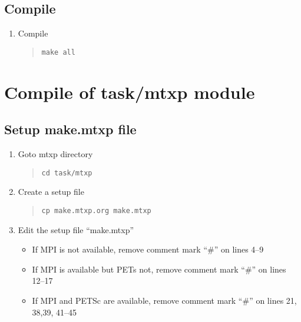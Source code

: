 \documentclass[11pt]{article}
\begin{document}
\subsection{Compile}
\begin{enumerate}
\item
Compile
\begin{quote}
\begin{verbatim}
make all
\end{verbatim}
\end{quote}
\end{enumerate}

\section{Compile of task/mtxp module}

\subsection{Setup make.mtxp file}
\begin{enumerate}
\item
Goto mtxp directory
\begin{quote}
\begin{verbatim}
cd task/mtxp
\end{verbatim}
\end{quote}
\item
Create a setup file 
\begin{quote}
\begin{verbatim}
cp make.mtxp.org make.mtxp
\end{verbatim}
\end{quote}
\item
Edit the setup file ``make.mtxp''
\begin{itemize}
\item
If MPI is not available, 
remove comment mark ``\#'' on lines 4--9
\item
If MPI is available but PETs not, 
remove comment mark ``\#'' on lines 12--17
\item
If MPI and PETSc are available, 
remove comment mark ``\#'' on lines 21, 38,39, 41--45
\end{itemize}
\end{enumerate}
\end{document}
